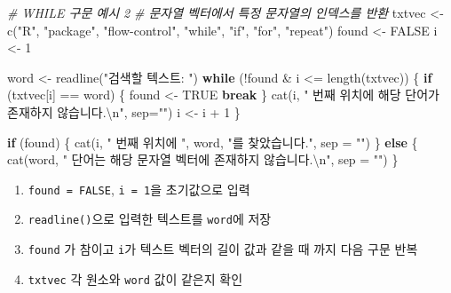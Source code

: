 \documentclass[
  11pt,
]{krantz}
\makeatletter
\newenvironment{Shaded}{\begin{snugshade}}{\end{snugshade}}
\newcommand{\AttributeTok}[1]{\textcolor[rgb]{0.61,0.61,0.61}{#1}}
\newcommand{\CommentTok}[1]{\textcolor[rgb]{0.37,0.37,0.37}{\textit{#1}}}
\newcommand{\ConstantTok}[1]{\textcolor[rgb]{0,0,0}{#1}}
\newcommand{\ControlFlowTok}[1]{\textcolor[rgb]{0.27,0.27,0.27}{\textbf{#1}}}
\newcommand{\DecValTok}[1]{\textcolor[rgb]{0.06,0.06,0.06}{#1}}
\newcommand{\FunctionTok}[1]{\textcolor[rgb]{0,0,0}{#1}}
\newcommand{\NormalTok}[1]{#1}
\newcommand{\OtherTok}[1]{\textcolor[rgb]{0.37,0.37,0.37}{#1}}
\newcommand{\SpecialCharTok}[1]{\textcolor[rgb]{0,0,0}{#1}}
\newcommand{\StringTok}[1]{\textcolor[rgb]{0.5,0.5,0.5}{#1}}
\providecommand{\tightlist}{%
  \setlength{\itemsep}{0pt}\setlength{\parskip}{0pt}}
\newenvironment{kframe}{%
\medskip{}
\setlength{\fboxsep}{.8em}
 \def\at@end@of@kframe{}%
 \ifinner\ifhmode%
  \def\at@end@of@kframe{\end{minipage}}%
  \begin{minipage}{\columnwidth}%
 \fi\fi%
 \def\FrameCommand##1{\hskip\@totalleftmargin \hskip-\fboxsep
 \colorbox{shadecolor}{##1}\hskip-\fboxsep
     \hskip-\linewidth \hskip-\@totalleftmargin \hskip\columnwidth}%
 \MakeFramed {\advance\hsize-\width
   \@totalleftmargin\z@ \linewidth\hsize
   \@setminipage}}%
 {\par\unskip\endMakeFramed%
 \at@end@of@kframe}
\renewenvironment{quote}{\begin{kframe}}{\end{kframe}}
\makeatother
\begin{document}
\begin{Shaded}
\begin{Highlighting}[]
\CommentTok{\# WHILE 구문 예시 2}
\CommentTok{\# 문자열 벡터에서 특정 문자열의 인덱스를 반환}
\NormalTok{txtvec }\OtherTok{\textless{}{-}} \FunctionTok{c}\NormalTok{(}\StringTok{"R"}\NormalTok{, }\StringTok{"package"}\NormalTok{, }\StringTok{"flow{-}control"}\NormalTok{, }\StringTok{"while"}\NormalTok{, }\StringTok{"if"}\NormalTok{, }\StringTok{"for"}\NormalTok{, }\StringTok{"repeat"}\NormalTok{)}
\NormalTok{found }\OtherTok{\textless{}{-}} \ConstantTok{FALSE}
\NormalTok{i }\OtherTok{\textless{}{-}} \DecValTok{1}

\NormalTok{word }\OtherTok{\textless{}{-}} \FunctionTok{readline}\NormalTok{(}\StringTok{"검색할 텍스트: "}\NormalTok{)}
\ControlFlowTok{while}\NormalTok{ (}\SpecialCharTok{!}\NormalTok{found }\SpecialCharTok{\&}\NormalTok{ i }\SpecialCharTok{\textless{}=} \FunctionTok{length}\NormalTok{(txtvec)) \{}
  \ControlFlowTok{if}\NormalTok{ (txtvec[i] }\SpecialCharTok{==}\NormalTok{ word) \{}
\NormalTok{    found }\OtherTok{\textless{}{-}} \ConstantTok{TRUE}
    \ControlFlowTok{break}
\NormalTok{  \}}
  \FunctionTok{cat}\NormalTok{(i, }\StringTok{" 번째 위치에 해당 단어가 존재하지 않습니다.}\SpecialCharTok{\textbackslash{}n}\StringTok{"}\NormalTok{, }\AttributeTok{sep=}\StringTok{""}\NormalTok{)}
\NormalTok{  i }\OtherTok{\textless{}{-}}\NormalTok{ i }\SpecialCharTok{+} \DecValTok{1}
\NormalTok{\}}

\ControlFlowTok{if}\NormalTok{ (found) \{}
  \FunctionTok{cat}\NormalTok{(i, }\StringTok{" 번째 위치에 "}\NormalTok{, word, }\StringTok{"를 찾았습니다."}\NormalTok{, }\AttributeTok{sep =} \StringTok{""}\NormalTok{)}
\NormalTok{\} }\ControlFlowTok{else}\NormalTok{ \{}
  \FunctionTok{cat}\NormalTok{(word, }\StringTok{" 단어는 해당 문자열 벡터에 존재하지 않습니다.}\SpecialCharTok{\textbackslash{}n}\StringTok{"}\NormalTok{, }\AttributeTok{sep =} \StringTok{""}\NormalTok{)}
\NormalTok{\}}
\end{Highlighting}
\end{Shaded}

\normalsize

\begin{quote}
\begin{enumerate}
\def\labelenumi{\arabic{enumi}.}
\tightlist
\item
  \texttt{found\ =\ FALSE}, \texttt{i\ =\ 1}을 초기값으로 입력
\item
  \texttt{readline()}으로 입력한 텍스트를 \texttt{word}에 저장
\item
  \texttt{found} 가 참이고 \texttt{i}가 텍스트 벡터의 길이 값과 같을 때 까지 다음 구문 반복
\item
  \texttt{txtvec} 각 원소와 \texttt{word} 값이 같은지 확인
\end{enumerate}
\end{quote}
\end{document}

